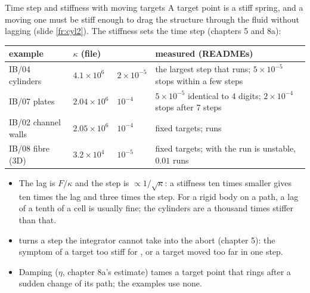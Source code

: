 \documentclass[aspectratio=169,11pt]{beamer}
\begin{document}
\begin{frame}{Time step and stiffness with moving targets}
\label{fr:dt}
\small A target point is a stiff spring, and a moving one must be stiff enough to drag the structure through the fluid without lagging (slide \ref{fr:cyl2}). The stiffness sets the time step (chapters 5 and 8a):
\vspace{1mm}

\scriptsize
\begin{tabular}{@{}L{0.18\textwidth}L{0.18\textwidth}L{0.2\textwidth}L{0.34\textwidth}@{}}
\toprule
example & $\kappa$ (file) &  & measured (READMEs)\\
\midrule
IB/04 cylinders & $4.1\times10^6$ & $2\times10^{-5}$ & the largest step that runs; $5\times10^{-5}$ stops within a few steps\\
IB/07 plates & $2.04\times10^6$ & $10^{-4}$ & $5\times10^{-5}$ identical to 4 digits; $2\times10^{-4}$ stops after 7 steps\\
IB/02 channel walls & $2.05\times10^6$ & $10^{-4}$ & fixed targets; runs\\
IB/08 fibre (3D) & $3.2\times10^4$ & $10^{-5}$ & fixed targets; with  the run is unstable, $0.01$ runs\\
\bottomrule
\end{tabular}

\vspace{1mm}
\footnotesize
\begin{itemize}
  \item The lag is $F/\kappa$ and the step is $\propto 1/\sqrt{\kappa}$: a stiffness ten times smaller gives ten times the lag and three times the step. For a rigid body on a path, a lag of a tenth of a cell is usually fine; the cylinders are a thousand times stiffer than that.
  \item {} turns a step the integrator cannot take into the abort  (chapter 5): the symptom of a target too stiff for , or a target moved too far in one step.
  \item Damping ($\eta$, chapter 8a's estimate) tames a target point that rings after a sudden change of its path; the examples use none.
\end{itemize}
\end{frame}
\end{document}
